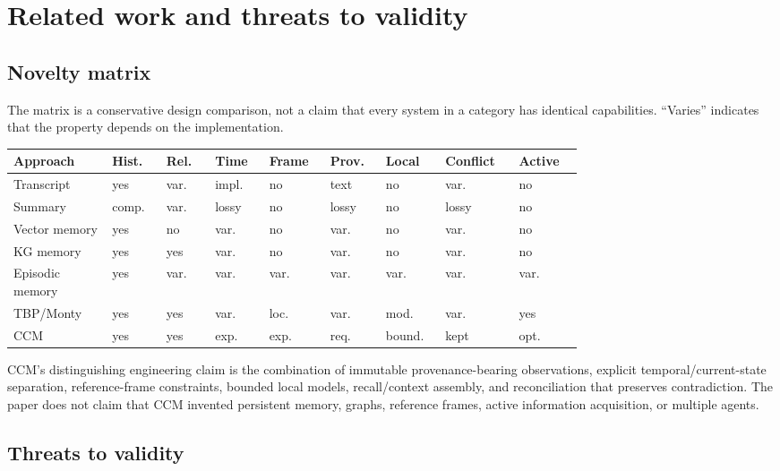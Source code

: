 \section{Related work and threats to validity}

\subsection{Novelty matrix}

The matrix is a conservative design comparison, not a claim that every system in a category has identical capabilities. ``Varies'' indicates that the property depends on the implementation.

\scriptsize
\setlength{\tabcolsep}{2pt}
\begin{longtable}{@{}p{0.14\linewidth}p{0.07\linewidth}p{0.07\linewidth}p{0.07\linewidth}p{0.07\linewidth}p{0.07\linewidth}p{0.07\linewidth}p{0.09\linewidth}p{0.09\linewidth}@{}}
\toprule
Approach & Hist. & Rel. & Time & Frame & Prov. & Local & Conflict & Active \\
\midrule
Transcript & yes & var. & impl. & no & text & no & var. & no \\
Summary & comp. & var. & lossy & no & lossy & no & lossy & no \\
Vector memory & yes & no & var. & no & var. & no & var. & no \\
KG memory & yes & yes & var. & no & var. & no & var. & no \\
Episodic memory & yes & var. & var. & var. & var. & var. & var. & var. \\
TBP/Monty & yes & yes & var. & loc. & var. & mod. & var. & yes \\
CCM & yes & yes & exp. & exp. & req. & bound. & kept & opt. \\
\bottomrule
\end{longtable}
\normalsize
\setlength{\tabcolsep}{6pt}

CCM's distinguishing engineering claim is the combination of immutable provenance-bearing observations, explicit temporal/current-state separation, reference-frame constraints, bounded local models, recall/context assembly, and reconciliation that preserves contradiction. The paper does not claim that CCM invented persistent memory, graphs, reference frames, active information acquisition, or multiple agents.

\subsection{Threats to validity}

